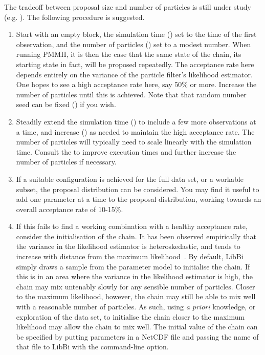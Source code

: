 The tradeoff between proposal size and number of particles is still under
study (e.g. \citet{Doucet2013}). The following procedure is suggested.
\begin{enumerate}
\item Start with an empty  block, the simulation
  time () set to the time of the first observation, and the
  number of particles () set to a modest number. When
  running PMMH, it is then the case that the same state of the chain, its
  starting state in fact, will be proposed repeatedly. The acceptance rate
  here depends entirely on the variance of the particle filter's likelihood
  estimator. One hopes to see a high acceptance rate here, say 50\% or
  more. Increase the number of particles until this is achieved. Note that
  that random number seed can be fixed () if you wish.
\item Steadily extend the simulation time () to include a few
  more observations at a time, and increase () as needed to
  maintain the high acceptance rate. The number of particles will typically
  need to scale linearly with the simulation time. Consult the
   to improve execution times and
  further increase the number of particles if necessary.
\item If a suitable configuration is achieved for the full data set, or a
  workable subset, the proposal distribution can be considered. You may find
  it useful to add one parameter at a time to the proposal distribution,
  working towards an overall acceptance rate of 10-15\%.
\item If this fails to find a working combination with a healthy acceptance
  rate, consider the initialisation of the chain. It has been observed
  empirically that the variance in the likelihood estimator is
  heteroskedastic, and tends to increase with distance from the maximum
  likelihood~\citep{Murray2013a}. By default, LibBi simply draws a sample from
  the parameter model to initialise the chain. If this is in an area where the
  variance in the likelihood estimator is high, the chain may mix untenably
  slowly for any sensible number of particles. Closer to the maximum
  likelihood, however, the chain may still be able to mix well with a
  reasonable number of particles. As such, using \textsl{a priori} knowledge,
  or exploration of the data set, to initialise the chain closer to the
  maximum likelihood may allow the chain to mix well. The initial value of the
  chain can be specified by putting parameters in a NetCDF file and passing
  the name of that file to LibBi with the  command-line
  option.
\end{enumerate}

